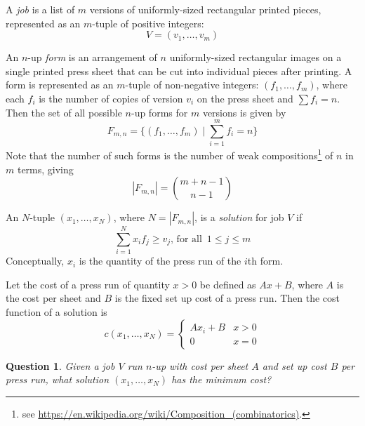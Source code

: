 \documentclass{article}
\newtheorem*{question}{Question}
\begin{document}
A {\em job\/} is a list of $m$ versions of uniformly-sized rectangular
printed pieces, represented as an $m$-tuple of positive integers:
\[
  V = (v_1, \ldots , v_m)
\]

An $n$-up {\em form\/} is an arrangement of $n$ uniformly-sized
rectangular images on a single printed press sheet that can be cut
into individual pieces after printing. A form is represented as an
$m$-tuple of non-negative integers: $ (f_1, \ldots, f_m) $, where each
$f_i$ is the number of copies of version $v_i$ on the press sheet and
$\sum{f_i} = n$. Then the set of all possible $n$-up forms for $m$
versions is given by
\[
  F_{m,n} = \{ (f_1,\ldots,f_m) \mid \sum_{i=1}^{m} f_i = n \}
\]
Note that the number of such forms is the number of weak
compositions\footnote{see \url{https://en.wikipedia.org/wiki/Composition_(combinatorics)}.}
of $n$ in $m$ terms, giving
\[
  |F_{m,n}| = \binom{m+n-1}{n-1}
\]

An $N$-tuple $(x_1,\ldots,x_N)$, where $N = |F_{m,n}|$, is a {\em solution\/} for job $V$ if
\[
  \sum_{i=1}^{N} x_i f_j \geq v_j \text{, for all }\, 1 \leq j \leq m
\]
Conceptually, $x_i$ is the quantity of the press run of the $i$th form.

Let the cost of a press run of quantity $x > 0$ be defined as $A x +
B$, where $A$ is the cost per sheet and $B$ is the fixed set up cost
of a press run. Then the cost function of a solution is
\[
  c(x_1,\ldots,x_N) =
  \begin{cases}
    Ax_i + B & x > 0 \\
    0        & x = 0
  \end{cases}
\]

\begin{question}
Given a job $V$ run $n$-up with cost per sheet $A$  and set up cost
$B$ per press run, what solution $(x_1,\ldots,x_N)$ has the minimum
cost?
\end{question}
\end{document}
